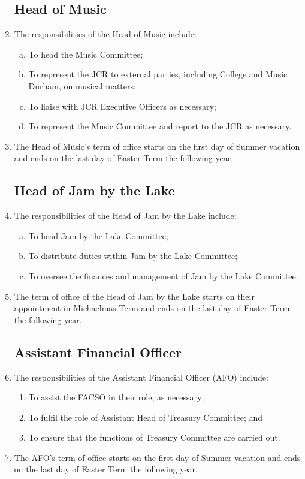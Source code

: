 \documentclass[12pt]{article}
\begin{document}
\begin{enumerate}
    \subsection{Head of Music}
    \item The responsibilities of the Head of Music include:
    \begin{enumerate}[(a)]
        \item To head the Music Committee;
        \item To represent the JCR to external parties, including College and Music Durham, on musical matters;
        \item To liaise with JCR Executive Officers as necessary;
        \item To represent the Music Committee and report to the JCR as necessary.
    \end{enumerate}
    \item The Head of Music's term of office starts on the first day of Summer vacation and ends on the last day of Easter Term the following year.

    \subsection{Head of Jam by the Lake}
    \item The responsibilities of the Head of Jam by the Lake include:
    \begin{enumerate}[(a)]
        \item To head Jam by the Lake Committee;
        \item To distribute duties within Jam by the Lake Committee;
        \item To oversee the finances and management of Jam by the Lake Committee.
    \end{enumerate}
    \item The term of office of the Head of Jam by the Lake starts on their appointment in Michaelmas Term and ends on the last day of Easter Term the following year.

    \subsection{Assistant Financial Officer}
    \item The responsibilities of the Assistant Financial Officer (AFO) include:
    \begin{enumerate}
        \item To assist the FACSO in their role, as necessary;
        \item To fulfil the role of Assistant Head of Treasury Committee; and
        \item To ensure that the functions of Treasury Committee are carried out.
    \end{enumerate}
    \item The AFO's term of office starts on the first day of Summer vacation and ends on the last day of Easter Term the following year.
\end{enumerate}
\newpage
\end{document}
